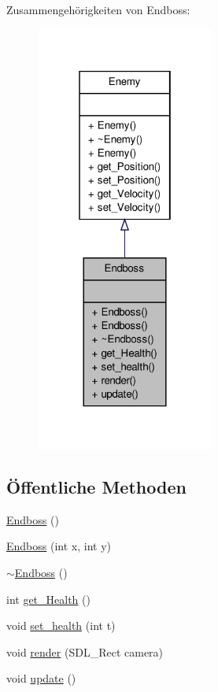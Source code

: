 Zusammengehörigkeiten von Endboss\-:
\nopagebreak
\begin{figure}[H]
\begin{center}
\leavevmode
\includegraphics[width=166pt]{class_endboss__coll__graph}
\end{center}
\end{figure}
\subsection*{Öffentliche Methoden}
\begin{DoxyCompactItemize}
\item 
\hyperlink{class_endboss_a07721dbe95bf63097d021b8b2a80791b}{Endboss} ()
\item 
\hyperlink{class_endboss_a6d553673da1e7b3d09ce54cd2503cbb7}{Endboss} (int x, int y)
\item 
\hyperlink{class_endboss_ab86f4e842ac4116c8df943539cc43787}{$\sim$\-Endboss} ()
\item 
int \hyperlink{class_endboss_a69ae2922f0f6647037926e917da4ee5e}{get\-\_\-\-Health} ()
\item 
void \hyperlink{class_endboss_a0bbf59647d911c6380246de92b5f5e21}{set\-\_\-health} (int t)
\item 
void \hyperlink{class_endboss_a17b150268f358172b140a984aaaa61c8}{render} (S\-D\-L\-\_\-\-Rect camera)
\item 
void \hyperlink{class_endboss_a7a56e4b087239ff73b7810c967e3858f}{update} ()
\end{DoxyCompactItemize}



